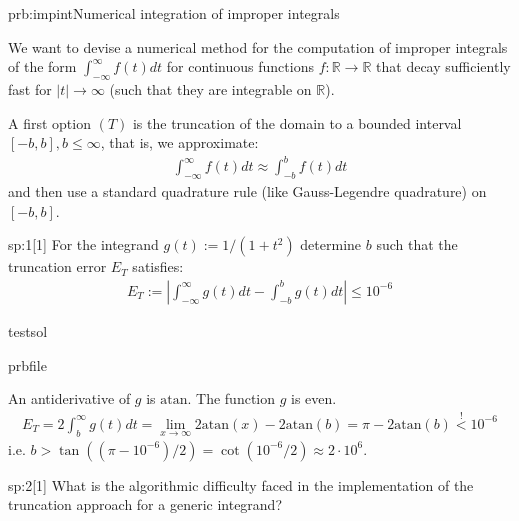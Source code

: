 \begin{samproblem}{prb:impint}{Numerical integration of improper integrals}{
  We want to devise a numerical method for the computation of improper integrals of the form 
  $\int_{-\infty}^{\infty} f(t) dt$ for continuous functions $f: \mathbb{R} \rightarrow \mathbb{R}$ 
  that decay sufficiently fast for $\lvert t \rvert \rightarrow \infty$ 
  (such that they are integrable on $\mathbb{R}$). 
 
  A first option $(T)$ is the truncation of the domain to a bounded interval $[-b,b], b \leq \infty$, that is, we approximate:
  \begin{align*}
    \int_{-\infty}^{\infty} f(t) dt \approx \int_{-b}^{b} f(t) dt
  \end{align*}
  and then use a standard quadrature rule (like Gauss-Legendre quadrature) on $[-b,b]$.
}
 
\begin{subproblem}{sp:1}[1]
  For the integrand $g(t) := 1 / (1 + t^2)$ determine $b$ such that the truncation error $E_T$ satisfies:
  \begin{align}
    E_T := \left\lvert  \int_{-\infty}^{\infty} g(t) dt - \int_{-b}^{b} g(t) dt \right \rvert \leq 10^{-6}
  \end{align}

  \begin{samwriteprbpart}{testsol}
    \begin{writeverbatim}{prbfile}
      \begin{samsolution}
        An antiderivative of $g$ is $\mathrm{atan}$. The function $g$ is even.
        \begin{align}
          E_T = 2 \int_b^\infty g(t) dt = \lim_{x \rightarrow \infty} 2 \mathrm{atan}(x) - 2 \mathrm{atan}(b) = \pi - 2 \mathrm{atan}(b) \overset{!}{<} 10^{-6}
        \end{align}
        i.e. $b > \tan((\pi -10^{-6}) / 2) = \cot(10^{-6} / 2) \approx 2 \cdot 10^6$.
      \end{samsolution}
    \end{writeverbatim}
  \end{samwriteprbpart}

\end{subproblem}
 
\begin{subproblem}{sp:2}[1]
  What is the algorithmic difficulty faced in the implementation of the truncation approach for a generic integrand?


\end{subproblem}
\end{samproblem}
